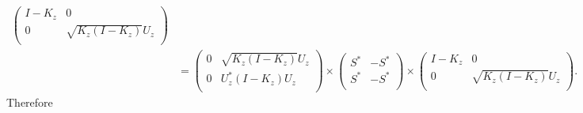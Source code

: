 \documentclass{amsart}
\begin{document}
\begin{align*}
                                      \left(
                                        \begin{array}{cc}
                                          I- K_z & 0 \\
                                          0 & \sqrt{K_{z}(I - K_z)}U_z \\
                                        \end{array}
                                      \right)\\
&=  \left(
                                       \begin{array}{cc}
                                        0 & \sqrt{K_{z}(I- K_{z})}U_{z} \\
                                        0 & U^{*}_{z}(I-K_z)U_{z} \\
                                       \end{array}
                                     \right) \times
                                    \left(
                                     \begin{array}{cc}
                                          S^{*} & -S^{*} \\
                                          S^{*} & -S^{*} \\
                                        \end{array}
                                      \right) \times
                                     \left(
                                        \begin{array}{cc}
                                          I- K_z & 0 \\
                                          0 & \sqrt{K_{z}(I - K_z)}U_z \\
                                        \end{array}
                                      \right).
\end{align*}
Therefore
\end{document}
